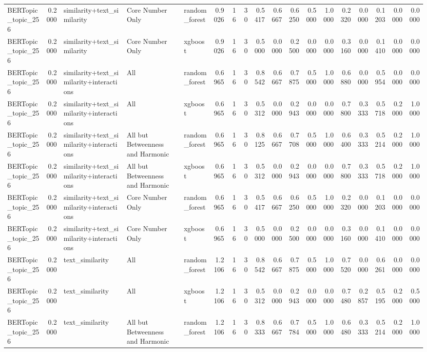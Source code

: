 \begin{tabular}{lrlllrrrrrrrrrrrrr}
BERTopic_topic_256 & 0.2000 & similarity+text_similarity & Core Number Only & random_forest & 0.9026 & 16 & 30 & 0.5417 & 0.6667 & 0.6250 & 0.5000 & 1.0000 & 0.2320 & 0.0000 & 0.1203 & 0.0000 & 0.0000 \\
BERTopic_topic_256 & 0.2000 & similarity+text_similarity & Core Number Only & xgboost & 0.9026 & 16 & 30 & 0.5000 & 0.0000 & 0.2500 & 0.0000 & 0.0000 & 0.3160 & 0.0000 & 0.1410 & 0.0000 & 0.0000 \\
BERTopic_topic_256 & 0.2000 & similarity+text_similarity+interactions & All & random_forest & 0.6965 & 16 & 30 & 0.8542 & 0.6667 & 0.7875 & 0.5000 & 1.0000 & 0.6880 & 0.0000 & 0.5954 & 0.0000 & 0.0000 \\
BERTopic_topic_256 & 0.2000 & similarity+text_similarity+interactions & All & xgboost & 0.6965 & 16 & 30 & 0.5312 & 0.0000 & 0.2943 & 0.0000 & 0.0000 & 0.7800 & 0.3333 & 0.5718 & 0.2000 & 1.0000 \\
BERTopic_topic_256 & 0.2000 & similarity+text_similarity+interactions & All but Betweenness and Harmonic & random_forest & 0.6965 & 16 & 30 & 0.8125 & 0.6667 & 0.7708 & 0.5000 & 1.0000 & 0.6400 & 0.3333 & 0.5214 & 0.2000 & 1.0000 \\
BERTopic_topic_256 & 0.2000 & similarity+text_similarity+interactions & All but Betweenness and Harmonic & xgboost & 0.6965 & 16 & 30 & 0.5312 & 0.0000 & 0.2943 & 0.0000 & 0.0000 & 0.7800 & 0.3333 & 0.5718 & 0.2000 & 1.0000 \\
BERTopic_topic_256 & 0.2000 & similarity+text_similarity+interactions & Core Number Only & random_forest & 0.6965 & 16 & 30 & 0.5417 & 0.6667 & 0.6250 & 0.5000 & 1.0000 & 0.2320 & 0.0000 & 0.1203 & 0.0000 & 0.0000 \\
BERTopic_topic_256 & 0.2000 & similarity+text_similarity+interactions & Core Number Only & xgboost & 0.6965 & 16 & 30 & 0.5000 & 0.0000 & 0.2500 & 0.0000 & 0.0000 & 0.3160 & 0.0000 & 0.1410 & 0.0000 & 0.0000 \\
BERTopic_topic_256 & 0.2000 & text_similarity & All & random_forest & 1.2106 & 16 & 30 & 0.8542 & 0.6667 & 0.7875 & 0.5000 & 1.0000 & 0.7520 & 0.0000 & 0.6261 & 0.0000 & 0.0000 \\
BERTopic_topic_256 & 0.2000 & text_similarity & All & xgboost & 1.2106 & 16 & 30 & 0.5312 & 0.0000 & 0.2943 & 0.0000 & 0.0000 & 0.7480 & 0.2857 & 0.5195 & 0.2000 & 0.5000 \\
BERTopic_topic_256 & 0.2000 & text_similarity & All but Betweenness and Harmonic & random_forest & 1.2106 & 16 & 30 & 0.8333 & 0.6667 & 0.7784 & 0.5000 & 1.0000 & 0.6480 & 0.3333 & 0.5214 & 0.2000 & 1.0000 \\

\end{tabular}
